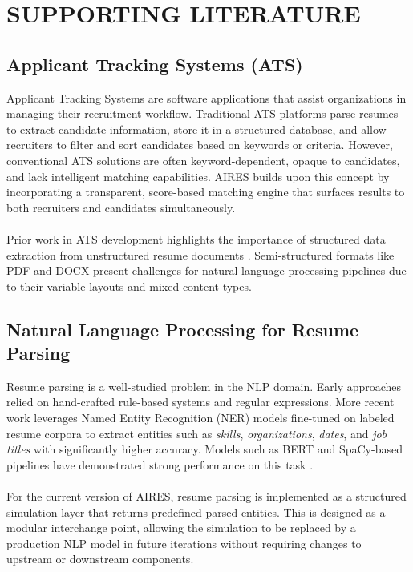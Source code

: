 \chapter{SUPPORTING LITERATURE}

\section{Applicant Tracking Systems (ATS)}
Applicant Tracking Systems are software applications that assist organizations in managing their recruitment workflow. Traditional ATS platforms parse resumes to extract candidate information, store it in a structured database, and allow recruiters to filter and sort candidates based on keywords or criteria. However, conventional ATS solutions are often keyword-dependent, opaque to candidates, and lack intelligent matching capabilities. AIRES builds upon this concept by incorporating a transparent, score-based matching engine that surfaces results to both recruiters and candidates simultaneously.\\\\
Prior work in ATS development highlights the importance of structured data extraction from unstructured resume documents \cite{Bharadwaj2020}. Semi-structured formats like PDF and DOCX present challenges for natural language processing pipelines due to their variable layouts and mixed content types.

\section{Natural Language Processing for Resume Parsing}
Resume parsing is a well-studied problem in the NLP domain. Early approaches relied on hand-crafted rule-based systems and regular expressions. More recent work leverages Named Entity Recognition (NER) models fine-tuned on labeled resume corpora to extract entities such as \textit{skills}, \textit{organizations}, \textit{dates}, and \textit{job titles} with significantly higher accuracy. Models such as BERT and SpaCy-based pipelines have demonstrated strong performance on this task \cite{Chen2021}.\\\\
For the current version of AIRES, resume parsing is implemented as a structured simulation layer that returns predefined parsed entities. This is designed as a modular interchange point, allowing the simulation to be replaced by a production NLP model in future iterations without requiring changes to upstream or downstream components.

